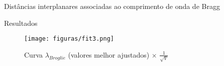 \documentclass[aspectratio=169,12.5pt,xcolor=dvipsnames]{beamer}
\begin{document}
\begin{frame}{Distâncias
interplanares associadas ao comprimento de onda de Bragg}

    \begin{table}[h!]
    \centering
    \caption{Valores de $\lambda_{Bragg}$ e $d$ (distâncias
interplanares), ambos em ångströms (\AA), para cada medida.}
    \end{table}
    

\end{frame}


\begin{frame}{Resultados}

        \begin{center}
        \begin{figure}
        \caption{Curva $\lambda_{Broglie}$ (valores melhor ajustados) $\times$ $\frac{1}{\sqrt{V}}$}
        \vspace*{-0.25cm}
        \texttt{[image: figuras/fit3.png]}\par
        \end{figure}
        \end{center}
    
\end{frame}
\end{document}
